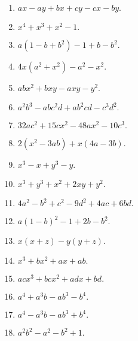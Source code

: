 \documentclass[a4paper,12pt]{article}
\begin{document}
\begin{multicols}{2}
\begin{enumerate}
\item $a x - a y + b x + c y - c x - b y .$

\item $x ^ { 4 } + x ^ { 3 } + x ^ { 2 } - 1 .$

\item $a ( 1 - b + b ^ { 2 } ) - 1 + b - b ^ { 2 } .$

\item $4 x ( a ^ { 2 } + x ^ { 2 } ) - a ^ { 2 } - x ^ { 2 } .$
\item $a b x ^ { 2 } + b x y - a x y - y ^ { 2 } .$

\item $a ^ { 2 } b ^ { 3 } - a b c ^ { 2 } d + a b ^ { 2 } c d - c ^ { 3 } d ^ { 2 } .$

\item $3 2 a c ^ { 2 } + 1 5 c x ^ { 2 } - 4 8 a x ^ { 2 } - 1 0 c ^ { 3 } .$

\item $2 ( x ^ { 2 } - 3 a b ) + x ( 4 a - 3 b ) .$

\item $x ^ { 3 } - x + y ^ { 3 } - y .$

\item $x ^ { 3 } + y ^ { 3 } + x ^ { 2 } + 2 x y + y ^ { 2 } .$

\item $4 a ^ { 2 } - b ^ { 2 } + c ^ { 2 } - 9 d ^ { 2 } + 4 a c + 6 b d .$

\item $a ( 1 - b ) ^ { 2 } - 1 + 2 b - b ^ { 2 } .$

\item $x ( x + z ) - y ( y + z ) .$

\item $x ^ { 3 } + b x ^ { 2 } + a x + a b .$


\item $a c x ^ { 3 } + b c x ^ { 2 } + a d x + b d .$

\item $a ^ { 4 } + a ^ { 3 } b - a b ^ { 3 } - b ^ { 4 } .$

\item $a ^ { 4 } - a ^ { 3 } b - a b ^ { 3 } + b ^ { 4 } .$

\item $a ^ { 2 } b ^ { 2 } - a ^ { 2 } - b ^ { 2 } + 1 .$


\end{enumerate}
\end{multicols}
\end{document}
